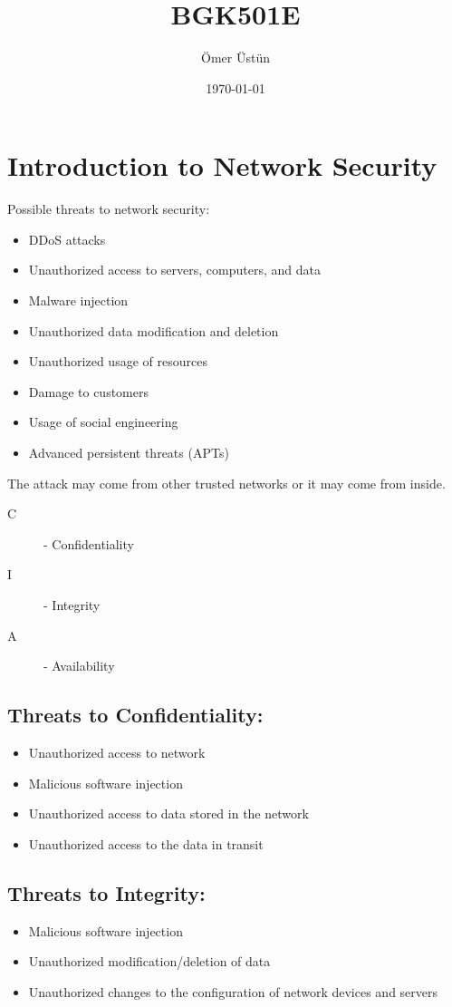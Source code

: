 \documentclass[12pt]{article}
\begin{document}
\title{BGK501E}
\date{\today}
\author{Ömer Üstün}
\maketitle

\section*{Introduction to Network Security}

Possible threats to network security:

\begin{itemize}
    \item DDoS attacks
    \item Unauthorized access to servers, computers, and data
    \item Malware injection
    \item Unauthorized data modification and deletion
    \item Unauthorized usage of resources
    \item Damage to customers
    \item Usage of social engineering
    \item Advanced persistent threats (APTs)
\end{itemize}

The attack may come from other trusted networks or it may come from inside.

\begin{description}
    \item[C]- Confidentiality
    \item[I]- Integrity
    \item[A]- Availability 
\end{description}

\subsection*{Threats to Confidentiality:}
\begin{itemize}
    \item Unauthorized access to network
    \item Malicious software injection
    \item Unauthorized access to data stored in the network
    \item Unauthorized access to the data in transit
\end{itemize}

\subsection*{Threats to Integrity:}
\begin{itemize}
    \item Malicious software injection
    \item Unauthorized modification/deletion of data
    \item Unauthorized changes to the configuration of network devices and servers
\end{itemize}
\end{document}
